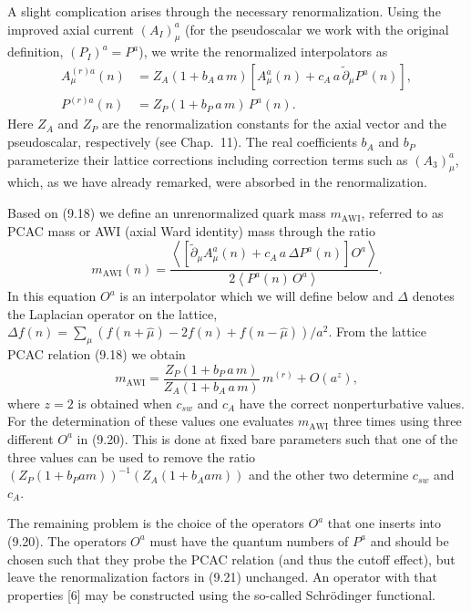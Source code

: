 A slight complication arises through the necessary renormalization. Using the
improved axial current $(A_I)^a_\mu$ (for the pseudoscalar we work with the
original definition, $(P_I)^a = P^a$), we write the renormalized interpolators
as
\begin{align}
  A^{(r)a}_\mu(n) &= Z_A(1 + b_A\,a\,m)\left[A^a_\mu(n) + c_A\,a\,\widetilde{\partial}_\mu P^a(n)\right] , \nonumber\\
  P^{(r)a}(n) &= Z_P(1 + b_P\,a\,m)\,P^a(n) .
\end{align}
Here $Z_A$ and $Z_P$ are the renormalization constants for the axial vector
and the pseudoscalar, respectively (see Chap.~11). The real coefficients $b_A$
and $b_P$ parameterize their lattice corrections including correction terms
such as $(A_3)^a_\mu$, which, as we have already remarked, were absorbed in the
renormalization.

Based on (9.18) we define an unrenormalized quark mass $m_{\mathrm{AWI}}$,
referred to as PCAC mass or AWI (axial Ward identity) mass through the ratio
\begin{equation}
  m_{\mathrm{AWI}}(n)
  = \frac{\left\langle \left[\widetilde{\partial}_\mu A^a_\mu(n) + c_A\,a\,\Delta P^a(n)\right] O^a \right\rangle}
         {2\left\langle P^a(n)\,O^a \right\rangle} .
\end{equation}
In this equation $O^a$ is an interpolator which we will define below and
$\Delta$ denotes the Laplacian operator on the lattice, $\Delta f(n) =
\sum_\mu (f(n + \hat\mu) - 2f(n) + f(n - \hat\mu))/a^2$. From the lattice PCAC
relation (9.18) we obtain
\begin{equation}
  m_{\mathrm{AWI}} = \frac{Z_P(1 + b_P\,a\,m)}{Z_A(1 + b_A\,a\,m)}\,m^{(r)} + O(a^z) ,
\end{equation}
where $z = 2$ is obtained when $c_{sw}$ and $c_A$ have the correct
nonperturbative values. For the determination of these values one evaluates
$m_{\mathrm{AWI}}$ three times using three different $O^a$ in (9.20). This is
done at fixed bare parameters such that one of the three values can be used to
remove the ratio $(Z_P(1+b_P am))^{-1}(Z_A(1+b_A am))$ and the other two
determine $c_{sw}$ and $c_A$.

The remaining problem is the choice of the operators $O^a$ that one inserts
into (9.20). The operators $O^a$ must have the quantum numbers of $P^a$ and
should be chosen such that they probe the PCAC relation (and thus the cutoff
effect), but leave the renormalization factors in (9.21) unchanged. An
operator with that properties [6] may be constructed using the so-called
Schr\"odinger functional.

